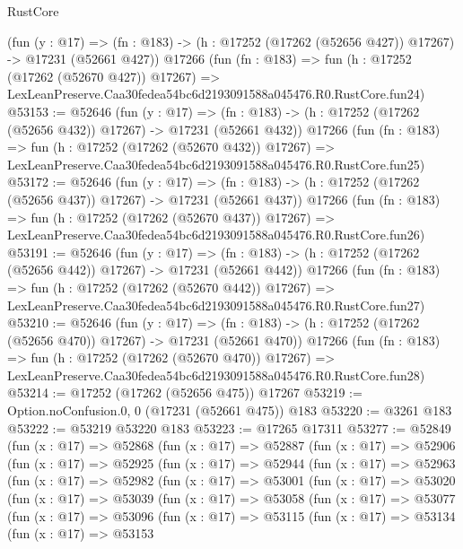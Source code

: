 \begin{lexlean}{RustCore}
\begin{coremodule}
    (fun (y : @17) =>
    (fn : @183) -> (h : @17252 (@17262 (@52656 @427)) @17267) -> @17231 (@52661 @427))
    @17266
    (fun (fn : @183) =>
    fun (h : @17252 (@17262 (@52670 @427)) @17267) =>
    LexLeanPreserve.Caa30fedea54bc6d2193091588a045476.R0.RustCore.fun24)
@53153 := @52646
    (fun (y : @17) =>
    (fn : @183) -> (h : @17252 (@17262 (@52656 @432)) @17267) -> @17231 (@52661 @432))
    @17266
    (fun (fn : @183) =>
    fun (h : @17252 (@17262 (@52670 @432)) @17267) =>
    LexLeanPreserve.Caa30fedea54bc6d2193091588a045476.R0.RustCore.fun25)
@53172 := @52646
    (fun (y : @17) =>
    (fn : @183) -> (h : @17252 (@17262 (@52656 @437)) @17267) -> @17231 (@52661 @437))
    @17266
    (fun (fn : @183) =>
    fun (h : @17252 (@17262 (@52670 @437)) @17267) =>
    LexLeanPreserve.Caa30fedea54bc6d2193091588a045476.R0.RustCore.fun26)
@53191 := @52646
    (fun (y : @17) =>
    (fn : @183) -> (h : @17252 (@17262 (@52656 @442)) @17267) -> @17231 (@52661 @442))
    @17266
    (fun (fn : @183) =>
    fun (h : @17252 (@17262 (@52670 @442)) @17267) =>
    LexLeanPreserve.Caa30fedea54bc6d2193091588a045476.R0.RustCore.fun27)
@53210 := @52646
    (fun (y : @17) =>
    (fn : @183) -> (h : @17252 (@17262 (@52656 @470)) @17267) -> @17231 (@52661 @470))
    @17266
    (fun (fn : @183) =>
    fun (h : @17252 (@17262 (@52670 @470)) @17267) =>
    LexLeanPreserve.Caa30fedea54bc6d2193091588a045476.R0.RustCore.fun28)
@53214 := @17252 (@17262 (@52656 @475)) @17267
@53219 := Option.noConfusion.{0, 0} (@17231 (@52661 @475)) @183
@53220 := @3261 @183
@53222 := @53219 @53220 @183
@53223 := @17265 @17311
@53277 := @52849
    (fun (x : @17) =>
    @52868
      (fun (x : @17) =>
      @52887
        (fun (x : @17) =>
        @52906
          (fun (x : @17) =>
          @52925
            (fun (x : @17) =>
            @52944
              (fun (x : @17) =>
              @52963
                (fun (x : @17) =>
                @52982
                  (fun (x : @17) =>
                  @53001
                    (fun (x : @17) =>
                    @53020
                      (fun (x : @17) =>
                      @53039
                        (fun (x : @17) =>
                        @53058
                          (fun (x : @17) =>
                          @53077
                            (fun (x : @17) =>
                            @53096
                              (fun (x : @17) =>
                              @53115
                                (fun (x : @17) =>
                                @53134
                                  (fun (x : @17) =>
                                  @53153

\end{coremodule}
\end{lexlean}
